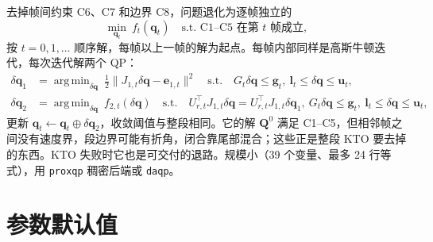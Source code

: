 \documentclass[11pt]{article}
\newcommand{\code}[1]{\texttt{\small #1}}
\newcommand{\dq}{\delta\bm q}
\DeclareMathOperator*{\argmin}{arg\,min}
\begin{document}
去掉帧间约束 C6、C7 和边界 C8，问题退化为逐帧独立的
\begin{equation}
\min_{\bm q_t}\ f_t(\bm q_t)\quad\text{s.t. C1--C5 在第 }t\text{ 帧成立},
\end{equation}
按 $t=0,1,\dots$ 顺序解，每帧以上一帧的解为起点。每帧内部同样是高斯牛顿迭代，每次迭代解两个 QP：
\begin{align}
\dq_1&=\argmin_{\dq}\ \tfrac12\|J_{1,t}\dq-\bm e_{1,t}\|^2\quad\text{s.t.}\quad G_t\dq\le\bm g_t,\ \bm l_t\le\dq\le\bm u_t,\\
\dq_2&=\argmin_{\dq}\ f_{2,t}(\dq)\quad\text{s.t.}\quad U_{r,t}^{\top}J_{1,t}\dq=U_{r,t}^{\top}J_{1,t}\dq_1,\ G_t\dq\le\bm g_t,\ \bm l_t\le\dq\le\bm u_t,
\end{align}
更新 $\bm q_t\leftarrow\bm q_t\oplus\dq_2$，收敛阈值与整段相同。它的解 $\bm Q^0$ 满足 C1--C5，但相邻帧之间没有速度界，段边界可能有折角，闭合靠尾部混合；这些正是整段 KTO 要去掉的东西。KTO 失败时它也是可交付的退路。规模小（39 个变量、最多 24 行等式），用 \code{proxqp} 稠密后端或 \code{daqp}。

\section{参数默认值}
\end{document}
